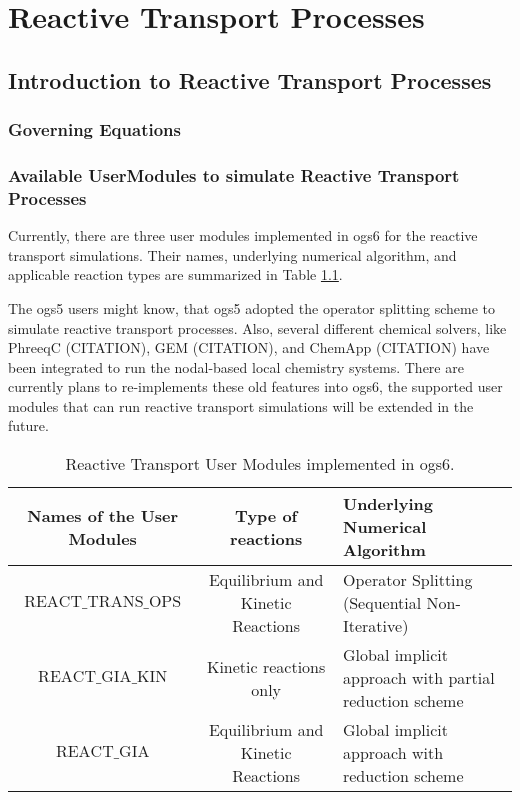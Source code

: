 \chapter{Reactive Transport Processes}

\section{Introduction to Reactive Transport Processes}

\subsection{Governing Equations}

\subsection{Available UserModules to simulate Reactive Transport Processes}

Currently, there are three user modules implemented in ogs6 for the reactive transport simulations. Their names, underlying numerical algorithm, and applicable reaction types are summarized in Table \ref{RT_tab_rt_modules}. 

The ogs5 users might know, that ogs5 adopted the operator splitting scheme to simulate reactive transport processes. Also, several different chemical solvers, like PhreeqC (CITATION), GEM (CITATION), and ChemApp (CITATION) have been integrated to run the nodal-based local chemistry systems. There are currently plans to re-implements these old features into ogs6, the supported user modules that can run reactive transport simulations  will be extended in the future. 
\begin{table}
\label{RT_tab_rt_modules}
\caption{Reactive Transport User Modules implemented in ogs6. }
\begin{tabular}{c c p{6cm}}
\hline
Names of the User Modules    & Type of reactions & Underlying Numerical Algorithm \\
\hline
$\mathrm{REACT\_TRANS\_OPS}$      & Equilibrium and Kinetic Reactions    & Operator Splitting (Sequential Non-Iterative)      \\
$\mathrm{REACT\_GIA\_KIN}$        & Kinetic reactions only     & Global implicit approach with partial reduction scheme      \\
$\mathrm{REACT\_GIA}$            & Equilibrium and Kinetic Reactions     & Global implicit approach with reduction scheme      \\
\hline
\end{tabular}
\end{table}


